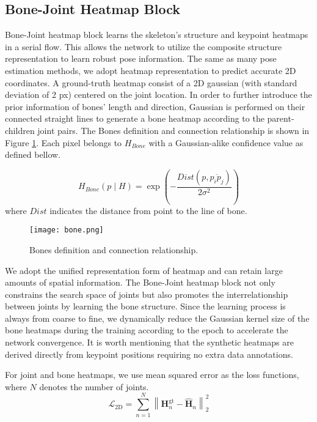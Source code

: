 \documentclass[letterpaper]{article} \usepackage{aaai21}  \usepackage{times}  \usepackage{helvet} \usepackage{courier}  \usepackage[hyphens]{url}  \usepackage{graphicx} \urlstyle{rm} \def\UrlFont{\rm}  \usepackage{natbib}  \usepackage{caption} \frenchspacing  \setlength{\pdfpagewidth}{8.5in}  \setlength{\pdfpageheight}{11in}
\begin{document}
\subsection{Bone-Joint Heatmap Block}
\label{sec2}
Bone-Joint heatmap block learns the skeleton’s structure and keypoint heatmaps in a serial flow. This allows the network to utilize the composite structure representation to learn robust pose information. The same as many pose estimation methods, we adopt heatmap representation to predict accurate 2D coordinates. A ground-truth heatmap consist of a 2D gaussian (with standard deviation of 2 px) centered on the joint location. In order to further introduce the prior information of bones’ length and direction, Gaussian is performed on their connected straight lines to generate a bone heatmap according to the parent-children joint pairs. The Bones definition and connection relationship is shown in Figure \ref{fig3}. Each pixel belongs to $H_{Bone}$ with a Gaussian-alike confidence value as defined bellow. 


\begin{equation}
H_{Bone}(p \mid H)=\exp \left(-\frac{Dist(p, \overline{p_{i} p_{j}})}{2 \sigma^{2}}\right)
\end{equation}
where $Dist$ indicates the distance from point to the line of bone.


\begin{figure}[htbp]
\centering
\texttt{[image: bone.png]} \caption{Bones definition and connection relationship.}
\label{fig3}
\end{figure}


We adopt the unified representation form of heatmap and can retain large amounts of spatial information. The Bone-Joint heatmap block not only constrains the search space of joints but also promotes the interrelationship between joints by learning the bone structure. Since the learning process is always from coarse to fine, we dynamically reduce the Gaussian kernel size of the bone heatmaps during the training according to the epoch to accelerate the network convergence. It is worth mentioning that the synthetic heatmaps are derived directly from keypoint positions requiring no extra data annotations.

For joint and bone heatmaps, we use mean squared error as the loss functions, where $N$ denotes the number of joints.
\begin{equation}
\mathcal{L}_{2 \mathrm{D}}=\sum_{n=1}^{N}\left\|\mathbf{H}_{n}^{\mathrm{gt}}-\hat{\mathbf{H}}_{n}\right\|_{2}^{2}
\end{equation}
\end{document}
